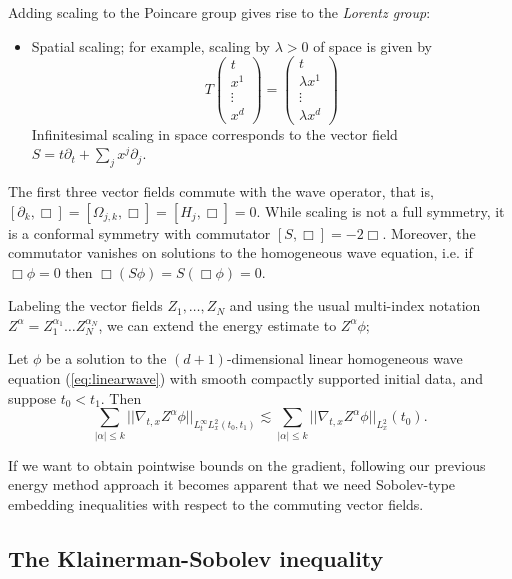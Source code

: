 Adding scaling to the Poincare group gives rise to the \emph{Lorentz group}:
\begin{itemize}
	\item Spatial scaling; for example, scaling by $\lambda > 0$ of space is given by 
				\[
					T
					\begin{pmatrix}
						t \\ x^1 \\ \vdots \\ x^d
					\end{pmatrix}
					=
					\begin{pmatrix}
						t \\ \lambda x^1\\ \vdots \\ \lambda x^d
					\end{pmatrix}
				\]
			Infinitesimal scaling in space corresponds to the vector field $S = t \partial_t + \sum_j x^j \partial_j$. 		 
\end{itemize}
The first three vector fields commute with the wave operator, that is, $[\partial_k, \Box] = [\Omega_{j, k}, \Box] = [H_j, \Box] = 0$. While scaling is not a full symmetry, it is a conformal symmetry with commutator $[S, \Box] = -2 \Box$. Moreover, the commutator vanishes on solutions to the homogeneous wave equation, i.e. if $\Box \phi = 0$ then $\Box (S \phi) = S(\Box \phi) = 0$. 

Labeling the vector fields $Z_1, \dots, Z_N$ and using the usual multi-index notation $Z^\alpha = Z_1^{\alpha_1} \dots Z_N^{\alpha_N}$, we can extend the energy estimate to $Z^\alpha \phi$;
\begin{theorem}
	Let $\phi$ be a solution to the $(d + 1)$-dimensional linear homogeneous wave equation (\ref{eq:linearwave}) with smooth compactly supported initial data, and suppose $t_0 < t_1$. Then 
		\[ \sum_{|\alpha| \leq k} || \nabla_{t, x} Z^\alpha \phi||_{L^\infty_t L^2_x (t_0, t_1)} \lesssim \sum_{|\alpha| \leq k}|| \nabla_{t, x} Z^\alpha \phi ||_{L^2_x} (t_0). \] \label{thm:energycom}
\end{theorem}
If we want to obtain pointwise bounds on the gradient, following our previous energy method approach it becomes apparent that we need Sobolev-type embedding inequalities with respect to the commuting vector fields.


\subsection{The Klainerman-Sobolev inequality}

